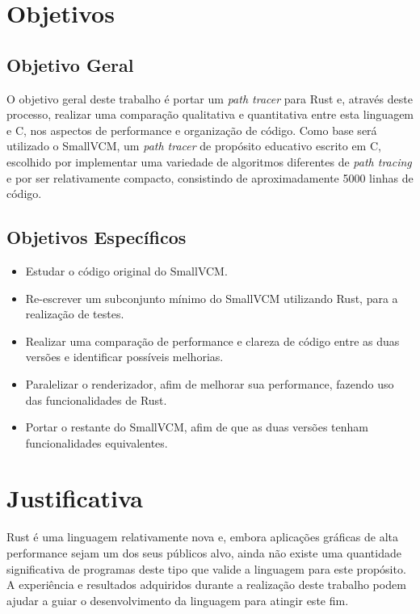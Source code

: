 \documentclass[12pt]{article}
\def\Cpp{{C\nolinebreak[4]\raisebox{.20ex}{\small\bf++}}}
\begin{document}
\section{Objetivos}

\subsection{Objetivo Geral}

O objetivo geral deste trabalho é portar um \emph{path tracer} para Rust e, através deste processo,
realizar uma comparação qualitativa e quantitativa entre esta linguagem e \Cpp, nos aspectos de
performance e organização de código. Como base será utilizado o SmallVCM\citep{smallvcm}, um
\emph{path tracer} de propósito educativo escrito em \Cpp, escolhido por implementar uma variedade
de algoritmos diferentes de \emph{path tracing} e por ser relativamente compacto, consistindo de
aproximadamente 5000 linhas de código.

\subsection{Objetivos Específicos}
\begin{itemize}
	\item Estudar o código original do SmallVCM.
	\item Re-escrever um subconjunto mínimo do SmallVCM utilizando Rust, para a realização de
		testes.
	\item Realizar uma comparação de performance e clareza de código entre as duas versões e
		identificar possíveis melhorias.
	\item Paralelizar o renderizador, afim de melhorar sua performance, fazendo uso das
		funcionalidades de Rust.
	\item Portar o restante do SmallVCM, afim de que as duas versões tenham funcionalidades
		equivalentes.
\end{itemize}

\section{Justificativa}

Rust é uma linguagem relativamente nova e, embora aplicações gráficas de alta performance sejam um
dos seus públicos alvo, ainda não existe uma quantidade significativa de programas deste tipo que
valide a linguagem para este propósito. A experiência e resultados adquiridos durante a realização
deste trabalho podem ajudar a guiar o desenvolvimento da linguagem para atingir este fim.
\end{document}

